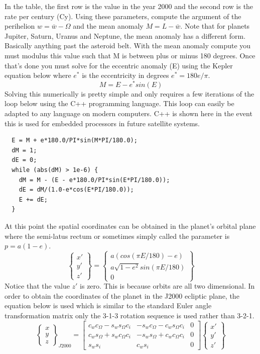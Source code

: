 \documentclass{article}
\begin{document}
In the table, the first row is the value in the year 2000 and
the second row is the rate per century (Cy). Using these parameters,
compute the argument of the perihelion $w = \bar{w} - \Omega$ and the
mean anomaly $M = L - \bar{w}$. Note that for planets Jupiter, Saturn,
Uranus and Neptune, the mean anomaly has a different form. Basically
anything past the asteroid belt. With the mean anomaly compute you
must modulus this value such that M is between plus or minus 180
degrees. Once that's done you must solve for the eccentric anomaly (E)
using the Kepler equation below where $e^*$ is the eccentricity in
degrees $e^* = 180e/\pi$. 
\begin{equation}
  M = E-e^*sin(E)
\end{equation}
Solving this numerically is pretty simple and only requires a few
iterations of the loop below using the C++ programming language. This
loop can easily be adapted to any language on modern computers. C++ is
shown here in the event this is used for embedded processors in future
satellite systems. 
\begin{verbatim}
  E = M + e*180.0/PI*sin(M*PI/180.0);
  dM = 1;
  dE = 0;
  while (abs(dM) > 1e-6) {
    dM = M - (E - e*180.0/PI*sin(E*PI/180.0));
    dE = dM/(1.0-e*cos(E*PI/180.0));
    E += dE;
  }        
\end{verbatim}
At this point the spatial coordinates can be obtained in the planet's
orbital plane where the semi-latus rectum or sometimes simply called
the parameter is $p=a(1-e)$. 
\begin{equation}
  \begin{Bmatrix} x' \\ y' \\ z' \end{Bmatrix} = \begin{Bmatrix} a(cos(\pi E/180) - e)
    \\ a\sqrt{1-e^2}sin(\pi E/180) \\ 0 \end{Bmatrix}
\end{equation}
Notice that the value $z'$ is zero. This is because orbits are all two
dimensional. In order to obtain the coordinates of the planet in the
J2000 ecliptic plane, the equation below is used which is similar to
the standard Euler angle transformation matrix only the 3-1-3 rotation
sequence is used rather than 3-2-1. 
\begin{equation}
  \begin{Bmatrix} x \\ y \\ z \end{Bmatrix}_{J2000} = \begin{bmatrix} c_wc_{\Omega}-s_ws_{\Omega}c_i &
    -s_wc_{\Omega}-c_ws_{\Omega}c_i & 0
    \\ c_ws_{\Omega}+s_wc_{\Omega}c_i &
    -s_ws_{\Omega}+c_wc_{\Omega}c_i & 0 \\
    s_ws_i & c_ws_i & 0 \end{bmatrix} \begin{Bmatrix} x' \\ y' \\ z' \end{Bmatrix}
\end{equation}
\end{document}

